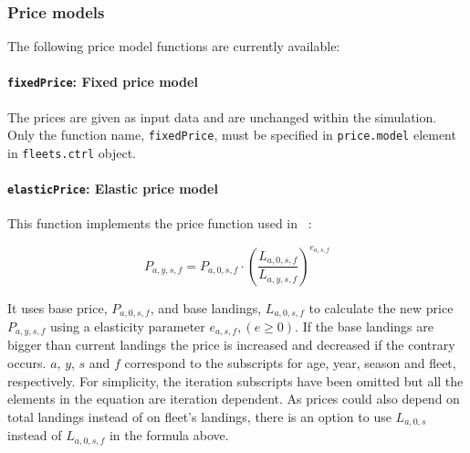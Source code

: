 \subsubsection{Price models}

  The following price model functions are currently available:
  
\paragraph{\texttt{fixedPrice}: Fixed price model} \hspace{0pt} \smallskip

The prices are given as input data and are unchanged within the simulation.
Only the function name, \texttt{fixedPrice},  must be specified in  \texttt{price.model} element in \texttt{fleets.ctrl}
object.



\paragraph{\texttt{elasticPrice}: Elastic price model} \hspace{0pt} \smallskip

This function implements the price function used in ~\cite{Kraak2004}:

	\begin{equation}\label{eq:elasticPrice}
		P_{a,y,s,f} = P_{a,0,s,f} \cdot \left( \frac{L_{a,0,s,f}}{L_{a,y,s,f}}\right)^{e_{a,s,f}} 
	\end{equation}
	
\noindent It uses base price, $P_{a,0,s,f}$,
and  base landings, $L_{a,0,s,f}$ to calculate the new price $P_{a,y,s,f}$ using a elasticity parameter $e_{a,s,f}, (e)$. 
If the base landings are bigger than current landings the price is increased and decreased if the contrary occurs.
$a$, $y$, $s$ and $f$ correspond to the subscripts for age, year, season and fleet, respectively. 
For simplicity, the iteration subscripts have been omitted but all the elements in the equation are iteration dependent.
As prices could also depend on total landings instead of on fleet's landings, there is an option to use  
$L_{a,0,s}$ instead of $L_{a,0,s,f}$ in the formula above.

